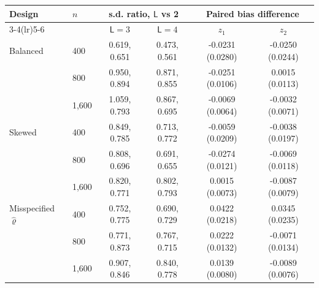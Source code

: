 \begin{tabular}{llcccc}
\toprule
Design & $n$ & \multicolumn{2}{c}{s.d. ratio, $\mathsf L$ vs 2} & \multicolumn{2}{c}{Paired bias difference} \\
\cmidrule(lr){3-4}\cmidrule(lr){5-6}
 & & $\mathsf L=3$ & $\mathsf L=4$ & $z_1$ & $z_2$ \\
\midrule
Balanced & 400 & 0.619, 0.651 & 0.473, 0.561 & -0.0231 (0.0280) & -0.0250 (0.0244) \\
 & 800 & 0.950, 0.894 & 0.871, 0.855 & -0.0251 (0.0106) & 0.0015 (0.0113) \\
 & 1,600 & 1.059, 0.793 & 0.867, 0.695 & -0.0069 (0.0064) & -0.0032 (0.0071) \\
\addlinespace
Skewed & 400 & 0.849, 0.785 & 0.713, 0.772 & -0.0059 (0.0209) & -0.0038 (0.0197) \\
 & 800 & 0.808, 0.696 & 0.691, 0.655 & -0.0274 (0.0121) & -0.0069 (0.0118) \\
 & 1,600 & 0.820, 0.771 & 0.802, 0.793 & 0.0015 (0.0073) & -0.0087 (0.0079) \\
\addlinespace
Misspecified $\hat\varrho$ & 400 & 0.752, 0.775 & 0.690, 0.729 & 0.0422 (0.0218) & 0.0345 (0.0235) \\
 & 800 & 0.771, 0.873 & 0.767, 0.715 & 0.0222 (0.0132) & -0.0071 (0.0134) \\
 & 1,600 & 0.907, 0.846 & 0.840, 0.778 & 0.0139 (0.0080) & -0.0089 (0.0076) \\
\bottomrule
\end{tabular}
